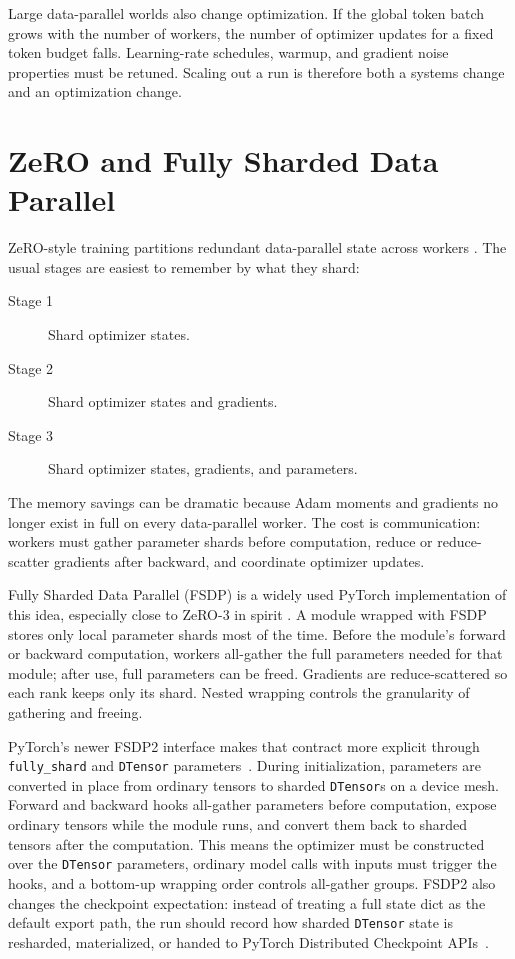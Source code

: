 Large data-parallel worlds also change optimization. If the global token batch grows with the number of workers, the number of optimizer updates for a fixed token budget falls. Learning-rate schedules, warmup, and gradient noise properties must be retuned. Scaling out a run is therefore both a systems change and an optimization change.

\section{ZeRO and Fully Sharded Data Parallel}
\label{sec:zero-fsdp}

ZeRO-style training partitions redundant data-parallel state across workers \cite{rajbhandari2020zero}. The usual stages are easiest to remember by what they shard:
\begin{description}
\item[Stage 1] Shard optimizer states.
\item[Stage 2] Shard optimizer states and gradients.
\item[Stage 3] Shard optimizer states, gradients, and parameters.
\end{description}
The memory savings can be dramatic because Adam moments and gradients no longer exist in full on every data-parallel worker. The cost is communication: workers must gather parameter shards before computation, reduce or reduce-scatter gradients after backward, and coordinate optimizer updates.

Fully Sharded Data Parallel (FSDP) is a widely used PyTorch implementation of this idea, especially close to ZeRO-3 in spirit \cite{zhao2023pytorchfsdp}. A module wrapped with FSDP stores only local parameter shards most of the time. Before the module's forward or backward computation, workers all-gather the full parameters needed for that module; after use, full parameters can be freed. Gradients are reduce-scattered so each rank keeps only its shard. Nested wrapping controls the granularity of gathering and freeing.

PyTorch's newer FSDP2 interface makes that contract more explicit through \texttt{fully\_shard} and \texttt{DTensor} parameters~\cite{pytorch2026fsdp2}. During initialization, parameters are converted in place from ordinary tensors to sharded \texttt{DTensor}s on a device mesh. Forward and backward hooks all-gather parameters before computation, expose ordinary tensors while the module runs, and convert them back to sharded tensors after the computation. This means the optimizer must be constructed over the \texttt{DTensor} parameters, ordinary model calls with inputs must trigger the hooks, and a bottom-up wrapping order controls all-gather groups. FSDP2 also changes the checkpoint expectation: instead of treating a full state dict as the default export path, the run should record how sharded \texttt{DTensor} state is resharded, materialized, or handed to PyTorch Distributed Checkpoint APIs~\cite{pytorch2026distributedcheckpoint}.

